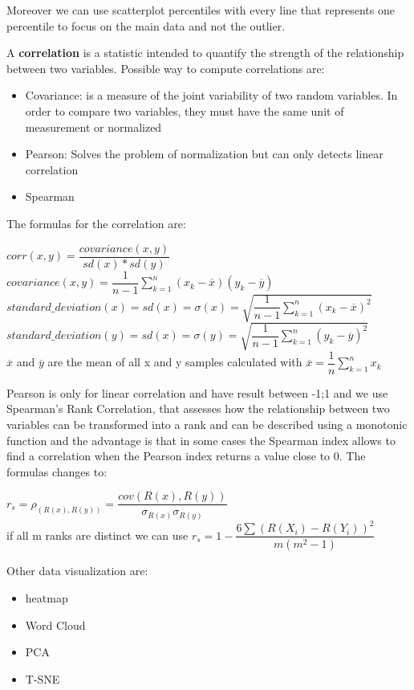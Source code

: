 Moreover we can use scatterplot percentiles with every line that represents one percentile to focus on the main data and not the outlier.

A \textbf{correlation} is a statistic intended to quantify the strength of the relationship between two variables. Possible way to compute correlations are:
\begin{itemize}
    \item Covariance: is a measure of the joint variability of two random variables. In order to compare two variables, they must have the same unit of measurement or normalized
    \item Pearson: Solves the problem of normalization but can only detects linear correlation
    \item Spearman
\end{itemize}
The formulas for the correlation are:
\begin{center}
    $corr(x,y)=  \dfrac{covariance(x,y)}{sd(x) * sd(y)}  $\\
    $covariance(x,y) = \dfrac{1}{n-1} \sum\limits_{k=1}^n (x_{k} - \overline{x} )(y_{k} - \overline{y} )$\\
    $standard\_deviation(x)= sd(x)= \sigma(x)= \sqrt{\dfrac{1}{n-1} \sum\limits_{k=1}^n (x_{k} - \overline{x} )^2 } $\\
    $standard\_deviation(y)= sd(x)= \sigma(y)= \sqrt{\dfrac{1}{n-1} \sum\limits_{k=1}^n (y_{k} - \overline{y} )^2 } $\\
    $ \overline{x}$ and $\overline{y} $ are the mean of all x and y samples calculated with $\overline{x} = \dfrac{1}{n} \sum\limits_{k=1}^n  x_{k} $
\end{center}
Pearson is only for linear correlation and have result between {-1;1} and we use Spearman's Rank Correlation, that assesses how the relationship between two variables can be transformed into  a rank and can be described using a monotonic function and the advantage is that in some cases the Spearman index allows to find a correlation when the Pearson index returns a value close to 0.
The formulas changes to:
\begin{center}
    $ r_s =  \rho_{(R(x),R(y))} = \dfrac{cov(R(x),R(y))}{\sigma_{R(x)} \sigma_{R(y)}}$\\
    if all m ranks are distinct we can use $ r_s = 1 - \dfrac{6 \sum (R(X_i) - R(Y_i))^2}{m(m^2 -1)}$
\end{center}
Other data visualization are:
\begin{itemize}
    \item heatmap
    \item Word Cloud
    \item PCA
    \item T-SNE
\end{itemize}

    



